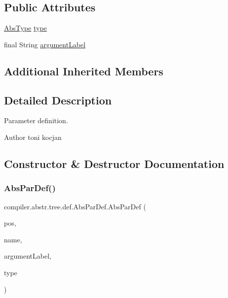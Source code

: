 \subsection*{Public Attributes}
\begin{DoxyCompactItemize}
\item 
\hyperlink{classcompiler_1_1abstr_1_1tree_1_1type_1_1_abs_type}{Abs\+Type} \hyperlink{classcompiler_1_1abstr_1_1tree_1_1def_1_1_abs_par_def_ae777af2ff583e2375f685e818c4495bd}{type}
\item 
final String \hyperlink{classcompiler_1_1abstr_1_1tree_1_1def_1_1_abs_par_def_a252cbe45af15b0cb35db8c44191affa4}{argument\+Label}
\end{DoxyCompactItemize}
\subsection*{Additional Inherited Members}


\subsection{Detailed Description}
Parameter definition. \begin{DoxyAuthor}{Author}
toni kocjan 
\end{DoxyAuthor}


\subsection{Constructor \& Destructor Documentation}
\mbox{\label{classcompiler_1_1abstr_1_1tree_1_1def_1_1_abs_par_def_a0215d5fd97169f4bcca5800719276bb4}} 
\subsubsection{\texorpdfstring{Abs\+Par\+Def()}{AbsParDef()}}
{\footnotesize\ttfamily compiler.\+abstr.\+tree.\+def.\+Abs\+Par\+Def.\+Abs\+Par\+Def (\begin{DoxyParamCaption}\item[{\hyperlink{classcompiler_1_1_position}{Position}}]{pos,  }\item[{String}]{name,  }\item[{String}]{argument\+Label,  }\item[{\hyperlink{classcompiler_1_1abstr_1_1tree_1_1type_1_1_abs_type}{Abs\+Type}}]{type }\end{DoxyParamCaption})}


